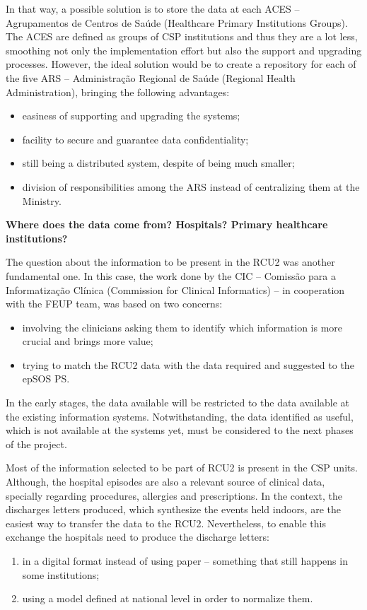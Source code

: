 In that way, a possible solution is to store the data at each ACES -- Agrupamentos de Centros de Saúde (Healthcare Primary Institutions Groups). The ACES are defined as groups of CSP institutions and thus they are a lot less, smoothing not only the implementation effort but also the support and upgrading processes. However, the ideal solution would be to create a repository for each of the five ARS -- Administração Regional de Saúde (Regional Health Administration), bringing the following advantages:
\begin{itemize}
\item easiness of supporting and upgrading the systems;
\item facility to secure and guarantee data confidentiality;
\item still being a distributed system, despite of being much smaller;
\item division of responsibilities among the ARS instead of centralizing them at the Ministry.
\end{itemize}



\textbf{Where does the data come from? Hospitals? Primary healthcare institutions?}

The question about the information to be present in the RCU2 was another fundamental one. In this case, the work done by the CIC -- Comissão para a Informatização Clínica (Commission for Clinical Informatics) -- in cooperation with the FEUP team, was based on two concerns:
\begin{itemize}
\item involving the clinicians asking them to identify which information is more crucial and brings more value;
\item trying to match the RCU2 data with the data required and suggested to the epSOS PS.
\end{itemize}
In the early stages, the data available will be restricted to the data available at the existing information systems. Notwithstanding, the data identified as useful, which is not available at the systems yet, must be considered to the next phases of the project.

Most of the information selected to be part of RCU2 is present in the CSP units. Although, the hospital episodes are also a relevant source of clinical data, specially regarding procedures, allergies and prescriptions. In the context, the discharges letters produced, which synthesize the events held indoors, are the easiest way to transfer the data to the RCU2. Nevertheless, to enable this exchange the hospitals need to produce the discharge letters:
\begin{enumerate}
\item in a digital format instead of using paper -- something that still happens in some institutions;
\item using a model defined at national level in order to normalize them.
\end{enumerate}



